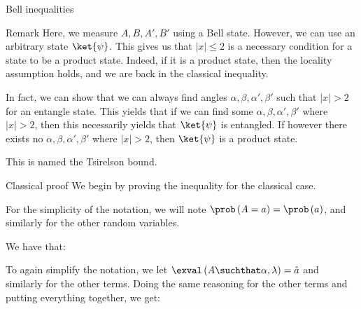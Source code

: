 \documentclass[a4paper]{article}
\begin{document}
\begin{parag}{Bell inequalities}
    \begin{subparag}{Remark}
        Here, we measure $A, B, A', B'$ using a Bell state. However, we can use an arbitrary state $\ket{\psi}$. This gives us that $\left|x\right| \leq 2$ is a necessary condition for a state to be a product state. Indeed, if it is a product state, then the locality assumption holds, and we are back in the classical inequality.

        In fact, we can show that we can always find angles $\alpha, \beta, \alpha', \beta'$ such that $\left|x\right| > 2$ for an entangle state. This yields that if we can find some $\alpha, \beta, \alpha', \beta'$ where $\left|x\right| > 2$, then this necessarily yields that $\ket{\psi}$ is entangled. If however there exists no $\alpha, \beta, \alpha', \beta'$ where $\left|x\right| > 2$, then $\ket{\psi}$ is a product state.

        This is named the Tsirelson bound.
    \end{subparag}

    \begin{subparag}{Classical proof}
        We begin by proving the inequality for the classical case. 

        For the simplicity of the notation, we will note $\prob\left(A = a\right) = \prob\left(a\right)$, and similarly for the other random variables. 

        We have that: 
        
        To again simplify the notation, we let $\exval\left(A \suchthat \alpha, \lambda\right) = \hat{a}$ and similarly for the other terms. Doing the same reasoning for the other terms and putting everything together, we get: 
        

\end{subparag}
\end{parag}
\end{document}
